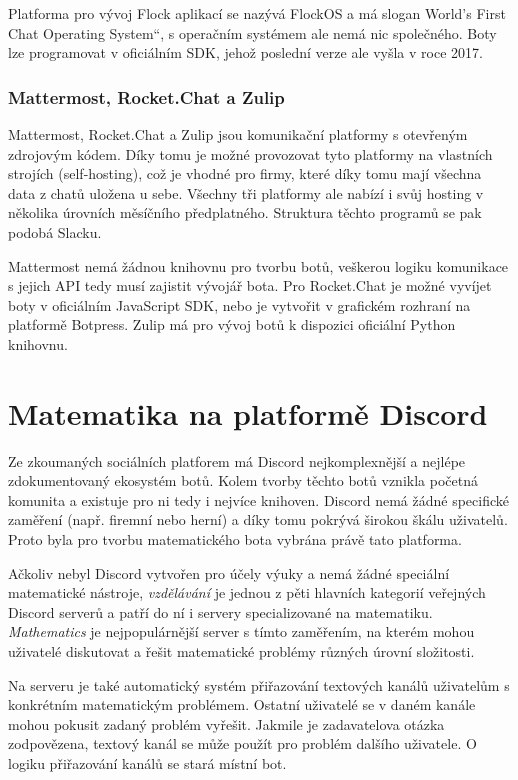 \documentclass[FM]{tulthesis}
\begin{document}
	Platforma pro vývoj Flock aplikací se nazývá FlockOS a má slogan \quotedblbase World's First Chat Operating System\textquotedblleft, s operačním systémem ale nemá nic společného. Boty lze programovat v oficiálním SDK, jehož poslední verze ale vyšla v roce 2017.
	
	\subsection{Mattermost, Rocket.Chat a Zulip}
	
	Mattermost, Rocket.Chat a Zulip jsou komunikační platformy s otevřeným zdrojovým kódem. Díky tomu je možné provozovat tyto platformy na vlastních strojích (self-hosting), což je vhodné pro firmy, které díky tomu mají všechna data z chatů uložena u sebe. Všechny tři platformy ale nabízí i svůj hosting v několika úrovních měsíčního předplatného. Struktura těchto programů se pak podobá Slacku.
	
	Mattermost nemá žádnou knihovnu pro tvorbu botů, veškerou logiku komunikace s jejich API tedy musí zajistit vývojář bota. Pro Rocket.Chat je možné vyvíjet boty v oficiálním JavaScript SDK, nebo je vytvořit v grafickém rozhraní na platformě Botpress. Zulip má pro vývoj botů k dispozici oficiální Python knihovnu.
		
	\chapter{Matematika na platformě Discord}
	
	Ze zkoumaných sociálních platforem má Discord nejkomplexnější a nejlépe zdokumentovaný ekosystém botů. Kolem tvorby těchto botů vznikla početná komunita a existuje pro ni tedy i nejvíce knihoven. Discord nemá žádné specifické zaměření (např. firemní nebo herní) a díky tomu pokrývá širokou škálu uživatelů. Proto byla pro tvorbu matematického bota vybrána právě tato platforma.
	
	Ačkoliv nebyl Discord vytvořen pro účely výuky a nemá žádné speciální matematické nástroje, \textit{vzdělávání} je jednou z pěti hlavních kategorií veřejných Discord serverů a patří do ní i servery specializované na matematiku. \textit{Mathematics} je nejpopulárnější server s tímto zaměřením, na kterém mohou uživatelé diskutovat a řešit matematické problémy různých úrovní složitosti.
	
	Na serveru je také automatický systém přiřazování textových kanálů uživatelům s konkrétním matematickým problémem. Ostatní uživatelé se v daném kanále mohou pokusit zadaný problém vyřešit. Jakmile je zadavatelova otázka zodpovězena, textový kanál se může použít pro problém dalšího uživatele. O logiku přiřazování kanálů se stará místní bot.
	
\end{document}
